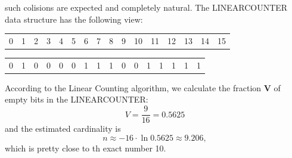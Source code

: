 \documentclass[a4paper,13pt]{article}
\theoremstyle{mytheor}
\begin{document}
\begin{mdframed}
such colisions are expected and completely natural. The LINEARCOUNTER
data structure has the following view:
\begin{center}
    \begin{tabular}{p{0.4cm}p{0.4cm}p{0.4cm}p{0.4cm}p{0.4cm}p{0.4cm}p{0.4cm}p{0.4cm}p{0.4cm}p{0.4cm}p{0.4cm}p{0.4cm}p{0.4cm}p{0.4cm}p{0.4cm}p{0.4cm}}
        0 & 1 & 2 & 3 & 4 & 5 & 6 & 7 & 8 & 9 & 10 & 11 & 12 & 13 & 14 & 15 %
    \end{tabular}
    \begin{tabular}{|p{0.4cm}|p{0.4cm}|p{0.4cm}|p{0.4cm}|p{0.4cm}|p{0.4cm}|p{0.4cm}|p{0.4cm}|p{0.4cm}|p{0.4cm}|p{0.4cm}|p{0.4cm}|p{0.4cm}|p{0.4cm}|p{0.4cm}|p{0.4cm}|}
        \hline
        0 & 1 & 0 & 0 & 0 & 0 & 1 & 1 & 1 & 0 & 0 & 1 & 1 & 1 & 1 & 1 \\ \cline{1-16} %
    \end{tabular}
\end{center}
\vspace{0.2cm}
According to the Linear Counting algorithm, we calculate the fraction \textbf{V}
of empty bits in the LINEARCOUNTER:
\begin{equation}
    V = \frac{9}{16} = 0.5625
\end{equation}
and the estimated cardinality is
\begin{equation}
    n \approx -16\cdot \ln 0.5625 \approx 9.206,
\end{equation}
which is pretty close to th exact number 10.
\end{mdframed}
\end{document}
